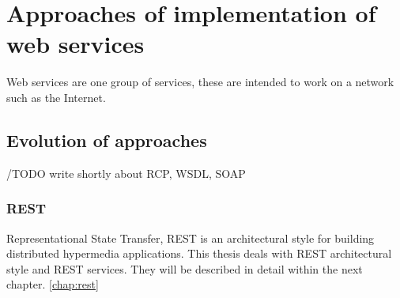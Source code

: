 \section{Approaches of implementation of web services}
Web services are one group of services, these are intended to work on a network such as the Internet.

\subsection{Evolution of approaches}
 
/TODO write shortly about RCP, WSDL, SOAP
 
\subsubsection{REST}

Representational State Transfer, REST is an architectural style for building distributed hypermedia applications. This thesis deals with REST architectural style and REST services. They will be described in detail within the next chapter. \ref{chap:rest}



    


